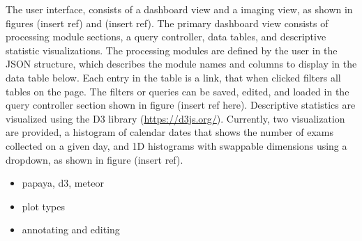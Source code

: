 The user interface, consists of a dashboard view and a imaging view, as shown in figures (insert ref) and (insert ref). The primary dashboard view consists of processing module sections, a query controller, data tables, and descriptive statistic visualizations. The processing modules are defined by the user in the JSON structure, which describes the module names and columns to display in the data table below. Each entry in the table is a link, that when clicked filters all tables on the page. The filters or queries can be saved, edited, and loaded in the query controller section shown in figure (insert ref here). Descriptive statistics are visualized using the D3 library (\href{https://d3js.org/}{https://d3js.org/}). Currently, two visualization are provided, a histogram of calendar dates that shows the number of exams collected on a given day, and 1D histograms with swappable dimensions using a dropdown, as shown in figure (insert ref).  

\begin{itemize}
\item papaya, d3, meteor
\item plot types
\item annotating and editing
\end{itemize}
